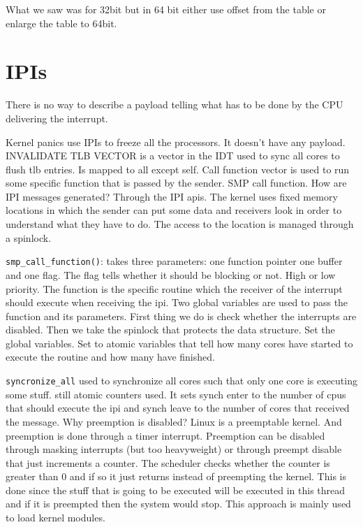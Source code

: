 \documentclass[twoside]{article}
\begin{document}
What we saw was for 32bit but in 64 bit either use offset from the table or
enlarge the table to 64bit.

\section{IPIs}
\label{sec:IPIs}

There is no way to describe a payload telling what has to be done by the
CPU delivering the interrupt.

Kernel panics use IPIs to freeze all the processors. It doesn't have any
payload. INVALIDATE TLB VECTOR is a vector in the IDT used to sync all cores
to flush tlb entries. Is mapped to all except self. Call function vector is
used to run some specific function that is passed by the sender. SMP call
function. 
How are IPI messages generated? Through the IPI apis. The kernel uses fixed
memory locations in which the sender can put some data and receivers look in
order to understand what they have to do. The access to the location is managed
through a spinlock.

\texttt{smp_call_function()}: takes three parameters: one function pointer
one buffer and one flag. The flag tells whether it should be blocking or not.
High or low priority. The function is the specific routine which the receiver
of the interrupt should execute when receiving the ipi. Two global variables
are used to pass the function and its parameters. First thing we do is check
whether the interrupts are disabled. Then we take the spinlock that protects
the data structure. Set the global variables. Set to atomic variables that
tell how many cores have started to execute the routine and how many have
finished. 

\texttt{syncronize_all} used to synchronize all cores such that only one core
is executing some stuff. still atomic counters used. It sets synch enter to
the number of cpus that should execute the ipi and synch leave to the number
of cores that received the message. Why preemption is disabled? Linux
is a preemptable kernel. And preemption is done through a timer interrupt.
Preemption can be disabled through masking interrupts (but too heavyweight) or
through preempt disable that just increments a counter. The scheduler checks
whether the counter is greater than 0 and if so it just returns instead of
preempting the kernel. This is done since the stuff that is going to be executed
will be executed in this thread and if it is preempted then the system would
stop. This approach is mainly used to load kernel modules. 
\end{document}
